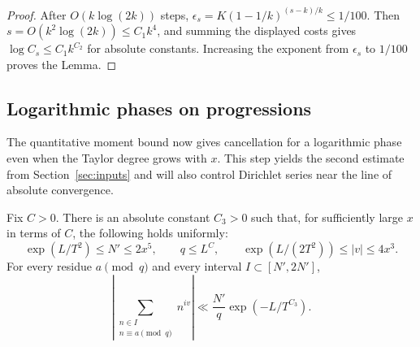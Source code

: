 \begin{proof}
After $O(k\log(2k))$ steps,
$\epsilon_s=K(1-1/k)^{(s-k)/k}\le1/100$.
Then $s=O(k^2\log(2k))\le C_1k^4$, and summing the displayed costs
gives $\log C_s\le C_1k^{C_2}$ for absolute constants.
Increasing the exponent from $\epsilon_s$ to $1/100$ proves the Lemma.
\end{proof}

\subsection{Logarithmic phases on progressions}

The quantitative moment bound now gives cancellation for a logarithmic
phase even when the Taylor degree grows with $x$. This step yields the
second estimate from Section~\ref{sec:inputs} and will also control
Dirichlet series near the line of absolute convergence.

\begin{lemma}\label{lp:log-phase}
Fix $C>0$.  There is an absolute constant $C_3>0$ such that, for
sufficiently large $x$ in terms of $C$, the following holds uniformly:
\[
 \exp(L/T^2)\le N'\le2x^5,\qquad q\le L^C,\qquad
 \exp(L/(2T^2))\le |v|\le4x^3.
\]
For every residue $a\pmod q$ and every interval $I\subset[N',2N']$,
\begin{equation}\label{lp:progression-estimate}
 \left|\sum_{\substack{n\in I\\n\equiv a\pmod q}}n^{iv}\right|
 \ll \frac{N'}q\exp(-L/T^{C_3}).
\end{equation}
\end{lemma}

